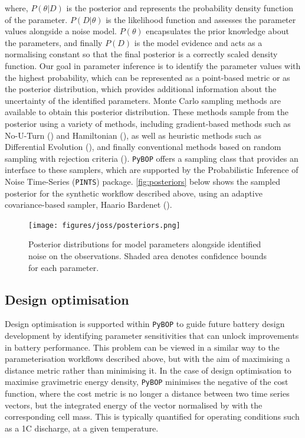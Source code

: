 \documentclass[
]{article}
\begin{document}
where, \(P(\theta|D)\) is the posterior and represents the probability
density function of the parameter. \(P(D|\theta)\) is the likelihood
function and assesses the parameter values alongside a noise model.
\(P(\theta)\) encapsulates the prior knowledge about the parameters, and
finally \(P(D)\) is the model evidence and acts as a normalising
constant so that the final posterior is a correctly scaled density
function. Our goal in parameter inference is to identify the parameter
values with the highest probability, which can be represented as a
point-based metric or as the posterior distribution, which provides
additional information about the uncertainty of the identified
parameters. Monte Carlo sampling methods are available to obtain this
posterior distribution. These methods sample from the posterior using a
variety of methods, including gradient-based methods such as No-U-Turn
() and Hamiltonian
(), as well as
heuristic methods such as Differential Evolution
(), and finally
conventional methods based on random sampling with rejection criteria
().
\texttt{PyBOP} offers a sampling class that provides an interface to
these samplers, which are supported by the Probabilistic Inference of
Noise Time-Series (\texttt{PINTS}) package. \autoref{fig:posteriors}
below shows the sampled posterior for the synthetic workflow described
above, using an adaptive covariance-based sampler, Haario Bardenet
().

\begin{figure}
\centering
\texttt{[image: figures/joss/posteriors.png]}
\caption{Posterior distributions for model parameters alongside
identified noise on the observations. Shaded area denotes confidence
bounds for each parameter. \label{fig:posteriors}}
\end{figure}

\subsection{Design optimisation}\label{design-optimisation}

Design optimisation is supported within \texttt{PyBOP} to guide future
battery design development by identifying parameter sensitivities that
can unlock improvements in battery performance. This problem can be
viewed in a similar way to the parameterisation workflows described
above, but with the aim of maximising a distance metric rather than
minimising it. In the case of design optimisation to maximise
gravimetric energy density, \texttt{PyBOP} minimises the negative of the
cost function, where the cost metric is no longer a distance between two
time series vectors, but the integrated energy of the vector normalised
by with the corresponding cell mass. This is typically quantified for
operating conditions such as a 1C discharge, at a given temperature.
\end{document}
